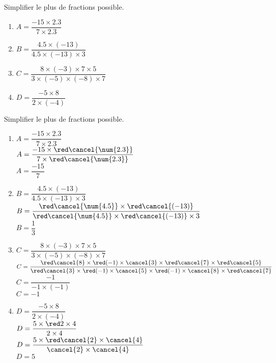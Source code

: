 \begin{exercice*}
    Simplifier le plus de fractions possible.
    \begin{multicols}{2}
        \begin{spacing}{2}
            \begin{enumerate}
                \item $A=\dfrac{-15\times\num{2.3}}{7\times\num{2.3}}$
                \item $B=\dfrac{\num{4.5}\times (-13)}{\num{4.5}\times (-13)\times 3}$
                \item $C=\dfrac{8\times (-3)\times 7\times 5}{3\times (-5)\times (-8)\times 7}$
                \item $D=\dfrac{-5\times 8}{2\times (-4)}$
            \end{enumerate}
        \end{spacing}        
    \end{multicols}
\end{exercice*}
\begin{corrige}
    Simplifier le plus de fractions possible.
    \begin{spacing}{2}
        \begin{enumerate}
            \item $A=\dfrac{-15\times\num{2.3}}{7\times\num{2.3}}$\\
            $A=\dfrac{-15\times{\red\cancel{\num{2.3}}}}{7\times{\red\cancel{\num{2.3}}}}$\\
            {\red $A=\dfrac{-15}{7}$}
            \item $B=\dfrac{\num{4.5}\times (-13)}{\num{4.5}\times (-13)\times 3}$\\
            $B=\dfrac{{\red\cancel{\num{4.5}}}\times {\red\cancel{(-13)}}}{{\red\cancel{\num{4.5}}}\times {\red\cancel{(-13)}}\times 3}$\\
            {\red $B=\dfrac{1}{3}$}
            \item $C=\dfrac{8\times (-3)\times 7\times 5}{3\times (-5)\times (-8)\times 7}$\\
            $C=\dfrac{{\red\cancel{8}}\times {\red (-1)\times \cancel{3}}\times {\red\cancel{7}}\times {\red\cancel{5}}}{{\red\cancel{3}}\times {\red (-1)\times \cancel{5}}\times {\red (-1)\times \cancel{8}}\times {\red\cancel{7}}}$\\
            {\red $C=\dfrac{-1}{-1\times (-1)}$\\
            $C=-1$
            }
            \item $D=\dfrac{-5\times 8}{2\times (-4)}$\\
            $D=\dfrac{5\times {\red 2\times 4}}{2\times 4}$\\
            $D=\dfrac{5\times {\red \cancel{2}\times \cancel{4}}}{\cancel{2}\times \cancel{4}}$\\
            {\red $D=5$}
        \end{enumerate}
    \end{spacing}        
\end{corrige}

